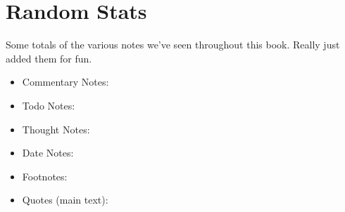 \newpage
\titleformat{\chapter}[frame]{\Large}{\filright\enspace\thechapter\enspace}{1.5cm}{\Large\bfseries\filcenter}
\chapter{Random Stats}
Some totals of the various notes we've seen throughout this book.
Really just added them for fun.
\begin{itemize}\scshape\large
    \item Commentary Notes: \thecommcounter
    \item Todo Notes: \thetodocounter
    \item Thought Notes: \thethoughtcounter
    \item Date Notes: \thedatecounter
    \item Footnotes: \thefootcounter
    \item Quotes (main text): \theepicounter
\end{itemize}

